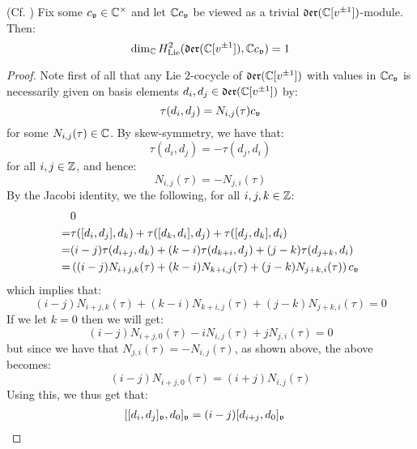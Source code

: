     \begin{lemma} \label{lemma: H^2_of_witt_algebra}
        (Cf. \cite[Proposition 1.3]{kac_raina_rozhkovskaya_bombay_lectures_on_highest_weight_modules_of_infinite_dimensional_lie_algebras}) Fix some $c_{\frakv} \in \bbC^{\x}$ and let $\bbC c_{\frakv}$ be viewed as a trivial $\der(\bbC[v^{\pm 1}])$-module. Then:
            $$\dim_{\bbC} H^2_{\Lie}( \der(\bbC[v^{\pm 1}]), \bbC c_{\frakv} ) = 1$$
    \end{lemma}
        \begin{proof}
            Note first of all that any Lie $2$-cocycle of $\der(\bbC[v^{\pm 1}])$ with values in $\bbC c_{\frakv}$ is necessarily given on basis elements $d_i, d_j \in \der(\bbC[v^{\pm 1}])$ by:
                $$\tau(d_i, d_j) = N_{i, j}(\tau) c_{\frakv}$$
            for some $N_{i, j}(\tau) \in \bbC$. By skew-symmetry, we have that:
                $$\tau(d_i, d_j) = -\tau(d_j, d_i)$$
            for all $i, j \in \Z$, and hence:
                $$N_{i, j}(\tau) = -N_{j, i}(\tau)$$
            By the Jacobi identity, we the following, for all $i, j, k \in \Z$:
                $$
                    \begin{aligned}
                        & 0
                        \\
                        = & \tau([d_i, d_j], d_k) + \tau([d_k, d_i], d_j) + \tau([d_j, d_k], d_i)
                        \\
                        = & (i - j) \tau(d_{i + j}, d_k) + (k - i) \tau(d_{k + i}, d_j) + (j - k) \tau(d_{j + k}, d_i)
                        \\
                        = & \left( (i - j) N_{i + j, k}(\tau) + (k - i) N_{k + i, j}(\tau) + (j - k) N_{j + k, i}(\tau) \right) c_{\frakv}
                    \end{aligned}
                $$
            which implies that:
                $$(i - j) N_{i + j, k}(\tau) + (k - i) N_{k + i, j}(\tau) + (j - k) N_{j + k, i}(\tau) = 0$$
            If we let $k = 0$ then we will get:
                $$(i - j) N_{i + j, 0}(\tau) - i N_{i, j}(\tau) + j N_{j, i}(\tau) = 0$$
            but since we have that $N_{j, i}(\tau) = -N_{i, j}(\tau)$, as shown above, the above becomes:
                $$(i - j) N_{i + j, 0}(\tau) = (i + j) N_{i, j}(\tau)$$
            Using this, we thus get that:
                $$
                    \begin{aligned}
                        & [[d_i, d_j]_{\frakv}, d_0]_{\frakv} = (i - j) [d_{i + j}, d_0]_{\frakv}

\end{aligned}$$
\end{proof}
